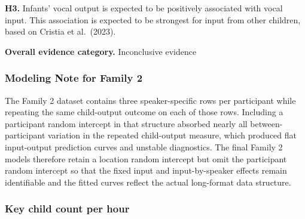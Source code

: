 \documentclass[
  letterpaper,
  DIV=11,
  numbers=noendperiod]{scrartcl}
\begin{document}
\textbf{H3.} Infants' vocal output is expected to be positively
associated with vocal input. This association is expected to be
strongest for input from other children, based on Cristia et al.~(2023).

\textbf{Overall evidence category.} Inconclusive evidence

\hypertarget{modeling-note-for-family-2}{%
\subsubsection{Modeling Note for Family
2}\label{modeling-note-for-family-2}}

The Family 2 dataset contains three speaker-specific rows per
participant while repeating the same child-output outcome on each of
those rows. Including a participant random intercept in that structure
absorbed nearly all between-participant variation in the repeated
child-output measure, which produced flat input-output prediction curves
and unstable diagnostics. The final Family 2 models therefore retain a
location random intercept but omit the participant random intercept so
that the fixed input and input-by-speaker effects remain identifiable
and the fitted curves reflect the actual long-format data structure.

\hypertarget{key-child-count-per-hour}{%
\subsubsection{Key child count per
hour}\label{key-child-count-per-hour}}
\end{document}
